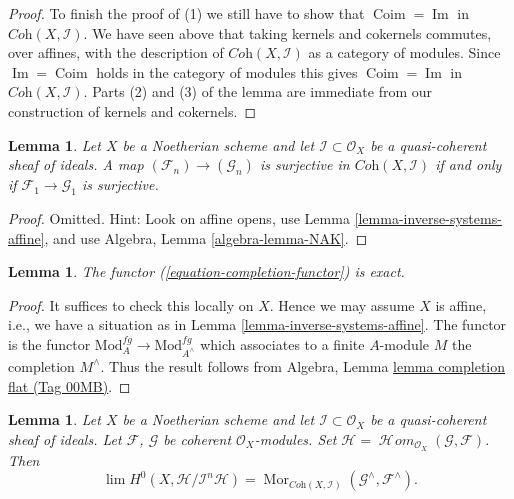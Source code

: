 \documentclass{amsart}
\theoremstyle{plain}
\newtheorem{lemma}[subsection]{Lemma}
\theoremstyle{definition}
\theoremstyle{remark}
\numberwithin{equation}{subsection}
\def\lim{\mathop{\mathrm{lim}}\nolimits}
\def\SheafHom{\mathop{\mathcal{H}\!\mathit{om}}\nolimits}
\def\Mor{\mathop{\mathrm{Mor}}\nolimits}
\def\Im{\mathop{\mathrm{Im}}}
\def\Coim{\mathop{\mathrm{Coim}}}
\begin{document}
\begin{proof}
\medskip\noindent
To finish the proof of (1) we still have to show that $\Coim = \Im$
in $\textit{Coh}(X, \mathcal{I})$. We have seen above that taking
kernels and cokernels commutes, over affines, with the description
of $\textit{Coh}(X, \mathcal{I})$ as a category of modules. Since
$\Im = \Coim$ holds in the category of modules
this gives $\Coim = \Im$ in $\textit{Coh}(X, \mathcal{I})$.
Parts (2) and (3) of the lemma are immediate from our construction
of kernels and cokernels.
\end{proof}


\begin{lemma}
\label{lemma-inverse-systems-surjective}
Let $X$ be a Noetherian scheme and let $\mathcal{I} \subset \mathcal{O}_X$
be a quasi-coherent sheaf of ideals. A map
$(\mathcal{F}_n) \to (\mathcal{G}_n)$ is surjective in
$\textit{Coh}(X, \mathcal{I})$
if and only if $\mathcal{F}_1 \to \mathcal{G}_1$ is surjective.
\end{lemma}

\begin{proof}
Omitted. Hint: Look on affine opens, use
Lemma \ref{lemma-inverse-systems-affine}, and use
Algebra, Lemma \ref{algebra-lemma-NAK}.
\end{proof}


\begin{lemma}
\label{lemma-exact}
The functor (\ref{equation-completion-functor}) is exact.
\end{lemma}

\begin{proof}
It suffices to check this locally on $X$. Hence we may assume $X$ is
affine, i.e., we have a situation as in
Lemma \ref{lemma-inverse-systems-affine}.
The functor is the functor $\text{Mod}^{fg}_A \to \text{Mod}^{fg}_{A^\wedge}$
which associates to a finite $A$-module $M$ the completion $M^\wedge$.
Thus the result follows from
Algebra, Lemma \href{https://stacks.math.columbia.edu/tag/00MB}{lemma completion flat (Tag 00MB)}.
\end{proof}


\begin{lemma}
\label{lemma-completion-internal-hom}
Let $X$ be a Noetherian scheme and let $\mathcal{I} \subset \mathcal{O}_X$
be a quasi-coherent sheaf of ideals. Let $\mathcal{F}$, $\mathcal{G}$ be
coherent $\mathcal{O}_X$-modules. Set
$\mathcal{H} = \SheafHom_{\mathcal{O}_X}(\mathcal{G}, \mathcal{F})$.
Then
$$
\lim H^0(X, \mathcal{H}/\mathcal{I}^n\mathcal{H}) =
\Mor_{\textit{Coh}(X, \mathcal{I})}
(\mathcal{G}^\wedge, \mathcal{F}^\wedge).
$$
\end{lemma}
\end{document}
